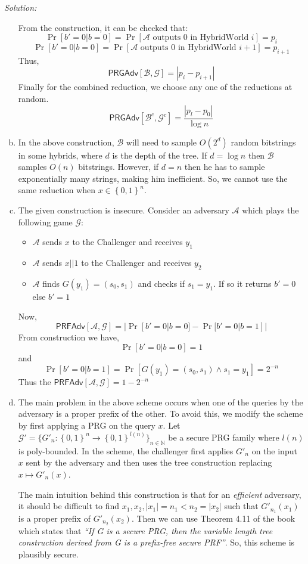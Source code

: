 \documentclass[a4paper, 11pt]{article}
\newenvironment{solution}
    {\textit{Solution:}}
    {\clearpage}
\newcommand{\bit}{\left\{0, 1\right\}}
\newcommand{\prf}{\mathsf{PRFAdv}}
\newcommand{\prg}{\mathsf{PRGAdv}}
\newcommand{\N}{\mathbb{N}}
\newcommand{\calA}{\mathcal{A}}
\newcommand{\calB}{\mathcal{B}}
\newcommand{\calG}{\mathcal{G}}
\begin{document}
\begin{solution}
\begin{enumerate}[(a)]
                  From the construction, it can be checked that:
                  $$\Pr[b'=0|b=0]=\Pr[\calA\text{ outputs 0 in HybridWorld } i]=p_{i}$$
                  $$\Pr[b'=0|b=0]=\Pr[\calA\text{ outputs 0 in HybridWorld } i+1]=p_{i+1}$$
                  Thus,
                  $$\prg[\calB,\calG]=|p_{i}-p_{i+1}|$$
                  Finally for the combined reduction, we choose any one of the reductions at random.
                  $$\prg[\calB^c,\calG^c]=\frac{|p_{l}-p_{0}|}{\log n}$$
        \item In the above construction, $\calB$ will need to sample $O(2^d)$ random bitstrings in some hybrids, where $d$ is the depth of the tree. If $d=\log n$ then $\calB$ samples $O(n)$ bitstrings. However, if $d=n$ then he has to sample exponentially many strings, making him inefficient. So, we cannot use the same reduction when $x\in\bit^n$.
        \item The given construction is insecure. Consider an adversary $\calA$ which plays the following game $\calG$:
        \begin{itemize}
            \item $\calA$ sends $x$ to the Challenger and receives $y_1$
            \item $\calA$ sends $x||1$ to the Challenger and receives $y_2$
            \item $\calA$ finds $G(y_1)=(s_0,s_1)$ and checks if $s_1=y_1$. If so it returns $b'=0$ else $b'=1$
        \end{itemize}
        Now,
        $$\prf[\calA,\calG]=|\Pr[b'=0|b=0]-\Pr[b'=0|b=1]|$$
        From construction we have,
        $$\Pr[b'=0|b=0]=1$$
        and
        $$\Pr[b'=0|b=1]=\Pr[G(y_1)=(s_0,s_1)\wedge s_1=y_1]=2^{-n}$$
        Thus the $\prf[\calA,\calG]=1-2^{-n}$
        \item The main problem in the above scheme occurs when one of the queries by the adversary is a proper prefix of the other. To avoid this, we modify the scheme by first applying a PRG on the query $x$. Let $\calG' = \{G'_n: \bit^n\rightarrow\bit^{l(n)}\}_{n\in\N}$ be a secure PRG family where $l(n)$ is poly-bounded. In the scheme, the challenger first applies $G'_n$ on the input $x$ sent by the adversary and then uses the tree construction replacing $x\mapsto G'_n(x)$.
        
        The main intuition behind this construction is that for an \textit{efficient} adversary, it should be difficult to find $x_1,x_2, |x_1|=n_1<n_2=|x_2|$ such that $G'_{n_1}(x_1)$ is a proper prefix of $G'_{n_2}(x_2)$. Then we can use Theorem 4.11 of the book which states that \textit{``If G is a secure PRG, then the variable length tree construction derived from G is a prefix-free secure PRF''}. So, this scheme is plausibly secure.
    \end{enumerate}
\end{solution}
\end{document}
